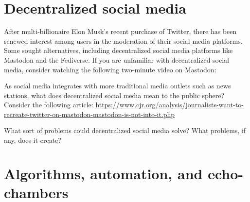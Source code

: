 \documentclass[
  letterpaper,
  DIV=11,
  numbers=noendperiod]{scrreprt}
\begin{document}
\section{Decentralized social media}\label{decentralized-social-media}

\begin{tcolorbox}[enhanced jigsaw, arc=.35mm, bottomrule=.15mm, bottomtitle=1mm, breakable, colback=white, colbacktitle=quarto-callout-note-color!10!white, colframe=quarto-callout-note-color-frame, coltitle=black, left=2mm, leftrule=.75mm, opacityback=0, opacitybacktitle=0.6, rightrule=.15mm, title=\textcolor{quarto-callout-note-color}{\faInfo}\hspace{0.5em}{In the news}, titlerule=0mm, toprule=.15mm, toptitle=1mm]

After multi-billionaire Elon Musk's recent purchase of Twitter, there
has been renewed interest among users in the moderation of their social
media platforms. Some sought alternatives, including decentralized
social media platforms like Mastodon and the Fediverse. If you are
unfamiliar with decentralized social media, consider watching the
following two-minute video on Mastodon:

\end{tcolorbox}

As social media integrates with more traditional media outlets such as
news stations, what does decentralized social media mean to the public
sphere? Consider the following article:
\url{https://www.cjr.org/analysis/journalists-want-to-recreate-twitter-on-mastodon-mastodon-is-not-into-it.php}

\begin{tcolorbox}[enhanced jigsaw, arc=.35mm, bottomrule=.15mm, bottomtitle=1mm, breakable, colback=white, colbacktitle=quarto-callout-tip-color!10!white, colframe=quarto-callout-tip-color-frame, coltitle=black, left=2mm, leftrule=.75mm, opacityback=0, opacitybacktitle=0.6, rightrule=.15mm, title=\textcolor{quarto-callout-tip-color}{\faLightbulb}\hspace{0.5em}{Pause and reflect}, titlerule=0mm, toprule=.15mm, toptitle=1mm]

What sort of problems could decentralized social media solve? What
problems, if any, does it create?

\end{tcolorbox}

\section{Algorithms, automation, and
echo-chambers}\label{algorithms-automation-and-echo-chambers}
\end{document}
